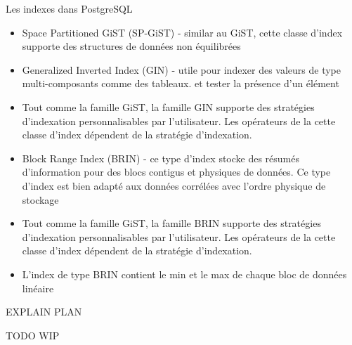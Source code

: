 \begin{frame}[fragile]{Les indexes dans PostgreSQL}


   \begin{itemize}
      \item Space Partitioned GiST (SP-GiST) - similar au GiST, cette classe d'index supporte des structures de données non équilibrées
      \item Generalized Inverted Index (GIN) - utile pour indexer des valeurs de type multi-composants comme des tableaux. et tester la présence d'un élément
      \item Tout comme la famille GiST, la famille GIN supporte des stratégies d'indexation personnalisables par l'utilisateur. Les opérateurs de la cette classe d'index dépendent de la stratégie d'indexation.
      \item Block Range Index (BRIN) - ce type d'index stocke des résumés d'information pour des blocs contigus et physiques de données. Ce type d'index est bien adapté aux données corrélées avec l'ordre physique de stockage
      \item Tout comme la famille GiST, la famille BRIN supporte des stratégies d'indexation personnalisables par l'utilisateur. Les opérateurs de la cette classe d'index dépendent de la stratégie d'indexation.
      \item L'index de type BRIN contient le min et le max de chaque bloc de données linéaire
   \end{itemize}

\end{frame}


\begin{frame}[fragile]{EXPLAIN PLAN}

   TODO
   WIP

\begin{toile}
\end{toile}

\end{frame}



